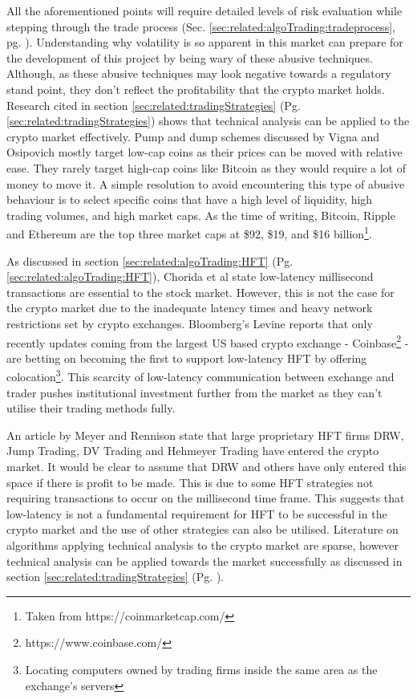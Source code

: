 All the aforementioned points will require detailed levels of risk evaluation while stepping through the trade process (Sec. \ref{sec:related:algoTrading:tradeprocess}, pg. \pageref{sec:related:algoTrading:tradeprocess}). Understanding why volatility is so apparent in this market can prepare for the development of this project by being wary of these abusive techniques. Although, as these abusive techniques may look negative towards a regulatory stand point, they don't reflect the profitability that the crypto market holds. Research cited in section \ref{sec:related:tradingStrategies} (Pg. \ref{sec:related:tradingStrategies}) shows that technical analysis can be applied to the crypto market effectively. Pump and dump schemes discussed by Vigna and Osipovich \cite{ART:VIGNA:2018} mostly target low-cap coins as their prices can be moved with relative ease. They rarely target high-cap coins like Bitcoin as they would require a lot of money to move it. A simple resolution to avoid encountering this type of abusive behaviour is to select specific coins that have a high level of liquidity, high trading volumes, and high market caps. As the time of writing, Bitcoin, Ripple and Ethereum are the top three market caps at \$92, \$19, and \$16 billion\footnote{Taken from https://coinmarketcap.com/}.  


As discussed in section \ref{sec:related:algoTrading:HFT} (Pg. \ref{sec:related:algoTrading:HFT}), Chorida et al \cite{REPORT:ChordiaEtAl:2013} state low-latency millisecond transactions are essential to the stock market. However, this is not the case for the crypto market due to the inadequate latency times and heavy network restrictions set by crypto exchanges. Bloomberg's Levine reports \cite{WEB:Levine:2018} that only recently updates coming from the largest US based crypto exchange - Coinbase\footnote{https://www.coinbase.com/} - are betting on becoming the first to support low-latency HFT by offering colocation\footnote{Locating computers owned by trading firms inside the same area as the exchange's servers}. This scarcity of low-latency communication between exchange and trader pushes institutional investment further from the market as they can't utilise their trading methods fully.

An article by Meyer and Rennison \cite{ART:Meyer:2017} state that large proprietary HFT firms DRW, Jump Trading, DV Trading and Hehmeyer Trading have entered the crypto market. It would be clear to assume that DRW and others have only entered this space if there is profit to be made. This is due to some HFT strategies not requiring transactions to occur on the millisecond time frame. This suggests that low-latency is not a fundamental requirement for HFT to be successful in the crypto market and the use of other strategies can also be utilised. Literature on algorithms applying technical analysis to the crypto market are sparse, however technical analysis can be applied towards the market successfully as discussed in section \ref{sec:related:tradingStrategies} (Pg. \pageref{sec:related:tradingStrategies}).


